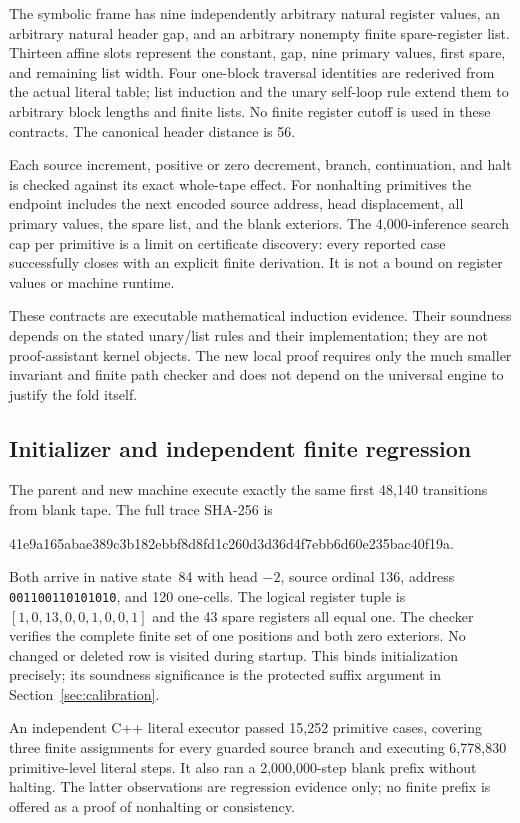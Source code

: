 The symbolic frame has nine independently arbitrary natural register
values, an arbitrary natural header gap, and an arbitrary nonempty finite
spare-register list. Thirteen affine slots represent the constant, gap,
nine primary values, first spare, and remaining list width. Four
one-block traversal identities are rederived from the actual literal
table; list induction and the unary self-loop rule extend them to
arbitrary block lengths and finite lists. No finite register cutoff is
used in these contracts. The canonical header distance is 56.

Each source increment, positive or zero decrement, branch, continuation,
and halt is checked against its exact whole-tape effect. For nonhalting
primitives the endpoint includes the next encoded source address, head
displacement, all primary values, the spare list, and the blank exteriors.
The 4,000-inference search cap per primitive is a limit on certificate
discovery: every reported case successfully closes with an explicit
finite derivation. It is not a bound on register values or machine runtime.

These contracts are executable mathematical induction evidence. Their
soundness depends on the stated unary/list rules and their implementation;
they are not proof-assistant kernel objects. The new local proof requires
only the much smaller invariant and finite path checker and does not
depend on the universal engine to justify the fold itself.

\subsection{Initializer and independent finite regression}
The parent and new machine execute exactly the same first 48,140
transitions from blank tape. The full trace SHA-256 is
\begin{center}\small\ttfamily
41e9a165abae389c3b182ebbf8d8fd1c260d3d36d4f7ebb6d60e235bac40f19a.
\end{center}
Both arrive in native state~84 with head $-2$, source ordinal 136,
address \texttt{001100110101010}, and 120 one-cells. The logical register
tuple is $[1,0,13,0,0,1,0,0,1]$ and the 43 spare registers all equal one.
The checker verifies the complete finite set of one positions and both
zero exteriors. No changed or deleted row is visited during startup.
This binds initialization precisely; its soundness significance is the
protected suffix argument in Section~\ref{sec:calibration}.

An independent C++ literal executor passed 15,252 primitive cases,
covering three finite assignments for every guarded source branch and
executing 6,778,830 primitive-level literal steps. It also ran a
2,000,000-step blank prefix without halting. The latter observations are
regression evidence only; no finite prefix is offered as a proof of
nonhalting or consistency.

